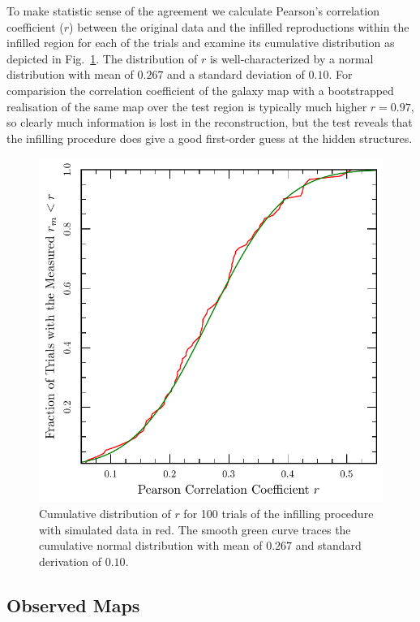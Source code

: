 \documentclass[useAMS,usenatbib]{mn2e}
\begin{document}
To make statistic sense of the agreement we calculate Pearson's
correlation coefficient ($r$) between the original data and the
infilled reproductions within the infilled region for each of the
trials and examine its cumulative distribution as depicted in
Fig.~\ref{fig:cleantest}.  The distribution of $r$ is
well-characterized by a normal distribution with mean of $0.267$ and a
standard deviation of $0.10$.  For comparision the correlation
coefficient of the galaxy map with a bootstrapped realisation of the
same map over the test region is typically much higher $r=0.97$, so
clearly much information is lost in the reconstruction, but the test
reveals that the infilling procedure does give a good first-order
guess at the hidden structures.
\begin{figure}
  \includegraphics[width=\columnwidth]{cleantest}
  \caption{Cumulative distribution of $r$ for 100 trials of the
    infilling procedure with simulated data in red.  The smooth green
    curve traces the cumulative normal distribution with mean of $0.267$
    and standard derivation of $0.10$.
  }
  \label{fig:cleantest}
\end{figure}

\subsection{Observed Maps}
\label{sec:observed-maps}
\end{document}
